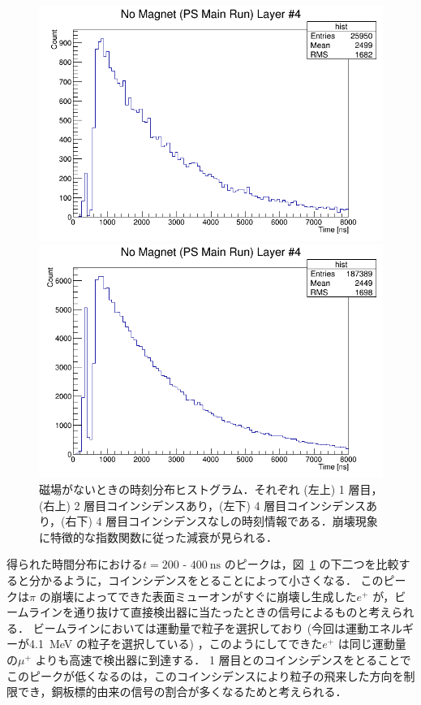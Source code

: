 \begin{figure}[h]
\begin{minipage}{0.45\textwidth}
	\end{minipage}
	\begin{minipage}{0.45\textwidth}
	\centering
	\includegraphics[width = \textwidth]{figure/odagawa/PSLifetimeDist_Layer3.png}
	\end{minipage}
	\begin{minipage}{0.45\textwidth}
	\centering
	\includegraphics[width = \textwidth]{figure/odagawa/PSLifetimeDistNoCoin_Layer3.png}
	\end{minipage}
	\caption{磁場がないときの時刻分布ヒストグラム．それぞれ (左上) 1 層目，(右上) 2 層目コインシデンスあり，(左下) 4 層目コインシデンスあり，(右下) 4 層目コインシデンスなしの時刻情報である．崩壊現象に特徴的な指数関数に従った減衰が見られる．}
	\label{fig:PSLifeDist}
\end{figure}%

得られた時間分布における$t = 200$ - $400~\mathrm{ns}$ のピークは，図~\ref{fig:PSLifeDist} の下二つを比較すると分かるように，コインシデンスをとることによって小さくなる．
このピークは$\pi$ の崩壊によってできた表面ミューオンがすぐに崩壊し生成した$e^{+}$ が，ビームラインを通り抜けて直接検出器に当たったときの信号によるものと考えられる．
ビームラインにおいては運動量で粒子を選択しており (今回は運動エネルギーが4.1~MeV の粒子を選択している) ，このようにしてできた$e^{+}$ は同じ運動量の$\mu^{+}$ よりも高速で検出器に到達する．
1 層目とのコインシデンスをとることでこのピークが低くなるのは，このコインシデンスにより粒子の飛来した方向を制限でき，銅板標的由来の信号の割合が多くなるためと考えられる．


